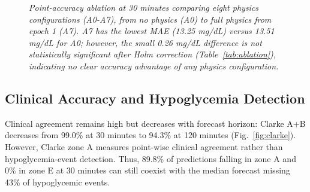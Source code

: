 \documentclass[journal]{IEEEtran}
\begin{document}
\begin{figure}[t]
\centering
{}
\caption{\small\textit{Point-accuracy ablation at 30 minutes comparing eight physics configurations (A0-A7), from no physics (A0) to full physics from epoch 1 (A7). A7 has the lowest MAE (13.25 mg/dL) versus 13.51 mg/dL for A0; however, the small 0.26 mg/dL difference is not statistically significant after Holm correction (Table~\ref{tab:ablation}), indicating no clear accuracy advantage of any physics configuration.}}
\label{fig:ablationfig}
\end{figure}

\subsection{Clinical Accuracy and Hypoglycemia Detection}

Clinical agreement remains high but decreases with forecast horizon: Clarke A+B decreases from 99.0\% at 30 minutes to 94.3\% at 120 minutes (Fig.~\ref{fig:clarke}). However, Clarke zone A measures point-wise clinical agreement rather than hypoglycemia-event detection. Thus, 89.8\% of predictions falling in zone A and 0\% in zone E at 30 minutes can still coexist with the median forecast missing 43\% of hypoglycemic events.
\end{document}
